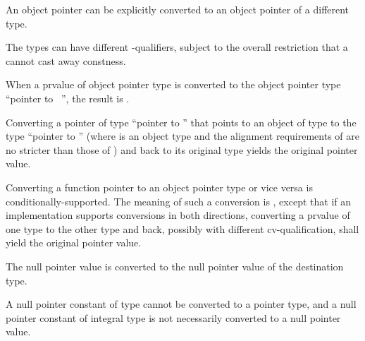 \pnum
An object pointer
can be explicitly converted to an object pointer of a different type.
\begin{footnote}
The
types can have different \cv-qualifiers, subject to
the overall
restriction that a  cannot cast away constness.
\end{footnote}
When a prvalue  of object pointer type is converted to
the object pointer type ``pointer to \cv{}~'', the result is .
\begin{note}
Converting a pointer of type ``pointer to ''
that points to an object of type 
to the type ``pointer to ''
(where  is an object type
and the alignment requirements of 
are no stricter than those of )
and back to its original type yields the original pointer value.
\end{note}

\pnum
Converting a function pointer to an object pointer
type or vice versa is
conditionally-supported. The meaning of such a conversion is
,
except that if an implementation
supports conversions in both directions, converting a prvalue of one type to the other
type and back, possibly with different cv-qualification, shall yield the original
pointer value.

\pnum
The null pointer value is converted to the null pointer value
of the destination type.
\begin{note}
A null pointer constant of type  cannot be converted to a
pointer type, and a null pointer constant of integral type is not necessarily
converted to a null pointer value.
\end{note}

